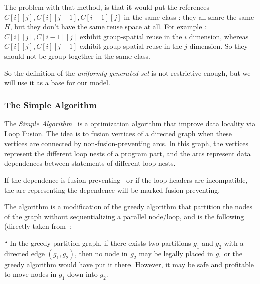 \documentclass[paper=a4, fontsize=11pt]{scrartcl}
\numberwithin{equation}{section}        %
\numberwithin{figure}{section}          %
\numberwithin{table}{section}               %
\begin{document}
            The problem with that method, is that it would put the references
            $C[i][j],C[i][j+1],C[i-1][j]$ in the same class : they all share the
            same $H$, but they don't have the same reuse space at all.
            For example : $C[i][j],C[i-1][j]$ exhibit group-spatial reuse in the $i$ dimension,
            whereas $C[i][j],C[i][j+1]$ exhibit group-spatial reuse in the $j$ dimension. So they
            should not be group together in the same class.
            \medskip

            So the definition of the \textit{uniformly generated set} is not restrictive enough,
            but we will use it as a base for our model.



        \subsubsection{The Simple Algorithm}
            The \textit{Simple Algorithm}~\cite{Kennedy94maximizingloop} is a
            optimization algorithm that improve data locality via Loop Fusion.
            The idea is to fusion vertices of a directed graph when these vertices
            are connected by non-fusion-preventing arcs.
            In this graph, the vertices represent the different loop nests of a program part,
            and the arcs represent data dependences between statements of different loop nests.

            If the dependence is fusion-preventing~\cite{Bacon:1994:CTH:197405.197406} or if the loop headers are incompatible,
            the arc representing the dependence will be marked fusion-preventing.

            The algorithm is a modification of the greedy algorithm that partition
            the nodes of the graph without sequentializing a parallel node/loop, and
            is the following (directly taken from~\cite{Kennedy94maximizingloop}:
            \medskip

            ``  In the greedy partition graph, if there exists two partitions $g_1$
                and $g_2$ with a directed edge $(g_1,g_2)$, then no node in $g_2$
                may be legally placed in $g_1$ or the greedy algorithm would have put it
                there. However, it may be safe and profitable to move nodes in $g_1$
                down into $g_2$.
\end{document}
